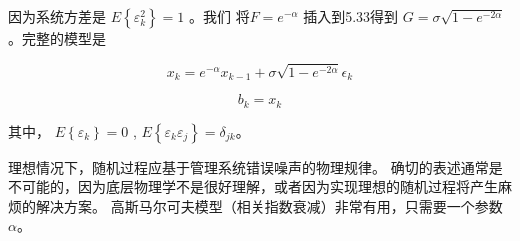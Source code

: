 		  因为系统方差是  $ E\left\lbrace\varepsilon_{k}^{2}\right\rbrace=1 $ 。我们 将$ F=e^{-\alpha} $ 插入到5.33得到 $ G=\sigma\sqrt{1-e^{-2\alpha}}   $ 。完整的模型是
		  	
		  \[ x_{k}=e^{-\alpha}x_{k-1}+\sigma\sqrt{1-e^{-2\alpha}}\epsilon_{k} \]
		 
		 \[ b_{k}=x_{k} \]
		 
		 其中， $ E\left\lbrace \varepsilon_{k}\right\rbrace=0  $ , $E\left\lbrace \varepsilon_{k}\varepsilon_{j}\right\rbrace=\delta_{jk}$。
		 
		 理想情况下，随机过程应基于管理系统错误噪声的物理规律。 确切的表述通常是不可能的，因为底层物理学不是很好理解，或者因为实现理想的随机过程将产生麻烦的解决方案。 高斯马尔可夫模型（相关指数衰减）非常有用，只需要一个参数 $ \alpha $。